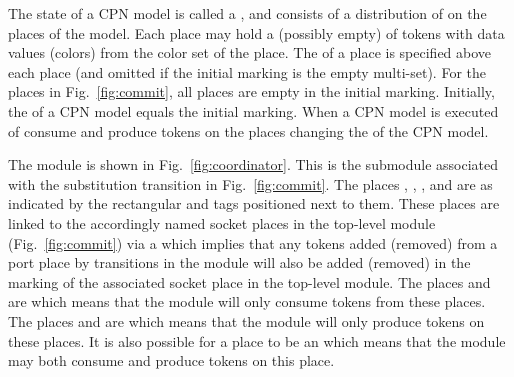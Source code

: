 
The state of a CPN model is called a , and consists
of a distribution of  on the places of the model. Each
place may hold a (possibly empty)  of tokens with
data values (colors) from the color set of the place. The
 of a place is specified above each place
(and omitted if the initial marking is the empty multi-set). For the
places in Fig.~\ref{fig:commit}, all places are empty in the initial
marking. Initially, the  of a CPN model
equals the initial marking. When a CPN model is executed
 of  consume and
produce tokens on the places changing the  of the CPN model.

 

The  module is shown in
Fig.~\ref{fig:coordinator}. This is the submodule associated with the
 substitution transition in
Fig.~\ref{fig:commit}. The places ,
, , and  are
 as indicated by the rectangular  and
 tags positioned next to them. These places are linked to
the accordingly named socket places in the top-level module
(Fig.~\ref{fig:commit}) via a  which
implies that any tokens added (removed) from a port place by
transitions in the  module will also be added
(removed) in the marking of the associated socket place in the
top-level module. The places  and 
are  which means that the
 module will only consume tokens from these
places.  The places  and  are
 which means that the
 module will only produce tokens on these
places. It is also possible for a place to be an  which means that the module may both consume and produce
tokens on this place.

